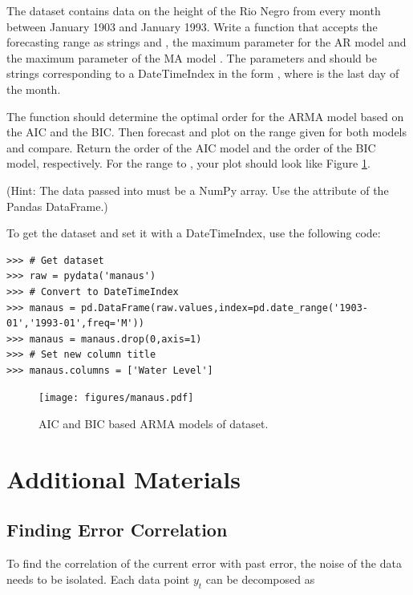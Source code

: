 \begin{problem}
The dataset  contains data on the height of the Rio Negro from every month between January 1903 and January 1993.
Write a function  that accepts the forecasting range as strings  and , the maximum parameter for the AR model  and the maximum parameter of the MA model .
The parameters  and  should be strings corresponding to a DateTimeIndex in the form , where  is the last day of the month.

The function should determine the optimal order for the ARMA model based on the AIC and the BIC.
Then forecast and plot on the range given for both models and compare.
Return the order of the AIC model and the order of the BIC model, respectively.
For the range  to , your plot should look like Figure \ref{fig:manaus}.

(Hint: The data passed into  must be a NumPy array. Use the attribute  of the Pandas DataFrame.)

To get the  dataset and set it with a DateTimeIndex, use the following code:
\begin{lstlisting}
>>> # Get dataset
>>> raw = pydata('manaus')
>>> # Convert to DateTimeIndex
>>> manaus = pd.DataFrame(raw.values,index=pd.date_range('1903-01','1993-01',freq='M'))
>>> manaus = manaus.drop(0,axis=1)
>>> # Set new column title
>>> manaus.columns = ['Water Level']
\end{lstlisting}
\label{prob:manaus}
\end{problem}

\begin{figure}[H]
\centering
\texttt{[image: figures/manaus.pdf]}
\caption{AIC and BIC based ARMA models of  dataset.}
\label{fig:manaus}
\end{figure}


\pagebreak

\section*{Additional Materials}

\subsection*{Finding Error Correlation}
To find the correlation of the current error with past error, the noise of the data needs to be isolated.
Each data point $y_t$ can be decomposed as

